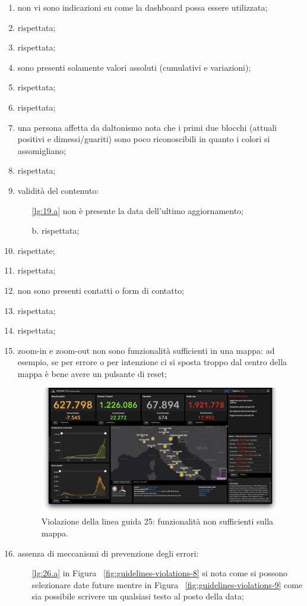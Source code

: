 \begin{enumerate}
    \item non vi sono indicazioni su come la dashboard possa essere utilizzata;
    \item rispettata;
    \item rispettata;
    \item sono presenti solamente valori assoluti (cumulativi e variazioni);
    \item rispettata;
    \item rispettata;
    \item una persona affetta da daltonismo nota che i primi due blocchi (attuali positivi e dimessi/guariti) sono poco riconoscibili in quanto i colori si assomigliano;
    \item rispettata;
    \item validità del contenuto:
        \begin{enumerate}[label=\alph*.]
            \item [\ref{lg:19.a}] non è presente la data dell'ultimo aggiornamento;
            \item [b.] rispettata;
        \end{enumerate}
    \item rispettate;
    \item rispettata;
    \item non sono presenti contatti o form di contatto;
    \item rispettata;
    \item rispettata;
    \item zoom-in e zoom-out non sono funzionalità sufficienti in una mappa: ad esempio, se per errore o per intenzione ci si sposta troppo dal centro della mappa è bene avere un pulsante di reset;
        \begin{figure}[H]
            \centering
            \includegraphics[width=0.5\columnwidth]{../../../assets/images/verifica-risorse-esistenti/guidelines_violations_7}
            \caption{Violazione della linea guida 25: funzionalità non sufficienti sulla mappa.}
            \label{fig:guidelines-violations-7}
        \end{figure}
    \item assenza di meccanismi di prevenzione degli errori:
        \begin{enumerate}[label=\alph*.]
            \item [\ref{lg:26.a}] in Figura ~\ref{fig:guidelines-violations-8} si nota come si possono selezionare date future mentre in Figura ~\ref{fig:guidelines-violations-9} come sia possibile scrivere un qualsiasi testo al posto della data;


\end{enumerate}
\end{enumerate}
